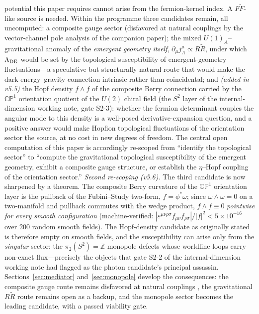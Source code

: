 \documentclass[11pt]{article}
\begin{document}
potential this paper requires cannot arise from the fermion-kernel
index.  A $F\tilde F$-like source is needed.  Within the
programme three candidates remain, all uncomputed: a composite
gauge sector (disfavored at natural couplings by the
vector-channel pole analysis of the companion paper); the
mixed $U(1)_A$--gravitational anomaly of the \emph{emergent
geometry itself}, $\partial_\mu j_A^\mu \propto R\tilde R$, under
which $\Lambda_{\rm DE}$ would be set by the topological
susceptibility of emergent-geometry fluctuations---a speculative
but structurally natural route that would make the dark
energy--gravity connection intrinsic rather than coincidental;
and \emph{(added in v5.5)} the Hopf density $f \wedge f$ of the
composite Berry connection carried by the $\mathbb{CP}^1$
orientation quotient of the $U(2)$ chiral field (the $S^2$ layer
of the internal-dimension working note, gate S2-3): whether the
fermion determinant couples the angular mode to this density is a
well-posed derivative-expansion question, and a positive answer
would make Hopfion topological fluctuations of the orientation
sector the source, at no cost in new degrees of freedom.
The central open computation of this paper is accordingly
re-scoped from ``identify the topological sector'' to ``compute
the gravitational topological susceptibility of the emergent
geometry, exhibit a composite gauge structure, or establish the
$\eta$--Hopf coupling of the orientation sector.''
\textit{Second re-scoping (v5.6).}
The third candidate is now sharpened by a theorem.
The composite Berry curvature of the $\mathbb{CP}^1$ orientation
layer is the pullback of the Fubini--Study two-form,
$f = \phi^*\omega$; since $\omega\wedge\omega = 0$ on a
two-manifold and pullback commutes with the wedge product,
$f \wedge f \equiv 0$ \emph{pointwise for every smooth
configuration} (machine-verified:
$|\varepsilon^{\mu\nu\rho\sigma}f_{\mu\nu}f_{\rho\sigma}|/|f|^2
< 5\times10^{-16}$ over $200$ random smooth fields).
The Hopf-density candidate as originally stated is therefore empty
on smooth fields, and the susceptibility can arise only from the
\emph{singular} sector: the $\pi_2(S^2) = \mathbb{Z}$ monopole
defects whose worldline loops carry non-exact flux---precisely the
objects that gate S2-2 of the internal-dimension working note had
flagged as the photon candidate's principal assassin.
Sections~\ref{sec:mediator} and~\ref{sec:monopole} develop the
consequences: the composite gauge route remains disfavored at
natural couplings \cite{Cheng:2026vector}, the gravitational
$R\tilde R$ route remains open as a backup, and the monopole sector
becomes the leading candidate, with a passed viability gate.
\end{document}
